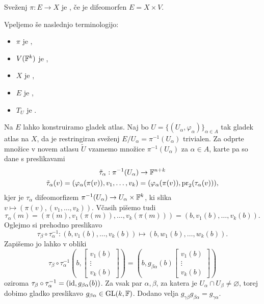 \begin{definicija}
  Sveženj $\pi: E \to X$ je , če je difeomorfen $E = X
  \times V$.
\end{definicija}

Vpeljemo še naslednjo terminologijo:
\begin{itemize}
\item $\pi$ je ,
\item $V(\mathbb{F}^k)$ je ,
\item $X$ je ,
\item $E$ je ,
\item $T_U$ je .
\end{itemize}

Na $E$ lahko konstruiramo gladek atlas.
Naj bo $U = \{ (U_\alpha, \varphi_\alpha) \}_{\alpha \in A}$ tak gladek atlas na
$X$, da je restringiran sveženj $E/U_\alpha = \pi^{-1}(U_\alpha)$ trivialen.
Za odprte množice v novem atlasu $\tilde{U}$ vzamemo množice
$\pi^{-1}(U_\alpha)$ za $\alpha \in A$, karte pa so dane s preslikavami
\begin{gather*}
  \tilde{\tau}_\alpha: \pi^{-1}(U_\alpha) \to \mathbb{F}^{n+k} \\
  \tilde{\tau}_\alpha(v)
  = ( \varphi_\alpha(\pi(v)), v_1, \ldots, v_k )
  = ( \varphi_\alpha(\pi(v)), \operatorname{pr}_2(\tau_\alpha(v)) ),
\end{gather*}
kjer je $\tau_\alpha$ difeomorfizem $\pi^{-1}(U_\alpha) \to U_\alpha \times
\mathbb{F}^k$, ki slika $v \mapsto (\pi(v), (v_1, \ldots, v_k))$.
Včasih pišemo tudi
\[
  \tau_\alpha(m) = (\pi(m), v_1(\pi(m)), \ldots, v_k(\pi(m)))
  = (b, v_1(b), \ldots, v_k(b)).
\]
Oglejmo si prehodno preslikavo
\[
  \tau_\beta \circ \tau_\alpha^{-1}
  : (b, v_1(b), \ldots, v_k(b)) \mapsto (b, w_1(b), \ldots, w_k(b)).
\]
Zapišemo jo lahko v obliki
\[
  \tau_\beta \circ \tau_\alpha^{-1}
  \left(
	b,
	\begin{bmatrix}
	  v_1(b) \\ \vdots \\ v_k(b)
	\end{bmatrix}
  \right)
  = \left(
	b,
	g_{\beta \alpha}(b)
	\begin{bmatrix}
	  v_1(b) \\ \vdots \\ v_k(b)
	\end{bmatrix}
  \right)
\]
oziroma $\tau_\beta \circ \tau_\alpha^{-1} = (\operatorname{id}, g_{\beta \alpha}(b))$.
Za vsak par $\alpha, \beta$, za katera je $U_\alpha \cap U_\beta \ne
\varnothing$, torej dobimo gladko preslikavo $g_{\beta \alpha} \in \operatorname{GL}(k, \mathbb{F})$.
Dodano velja $g_{\gamma \beta} g_{\beta \alpha} = g_{\gamma \alpha}$.

